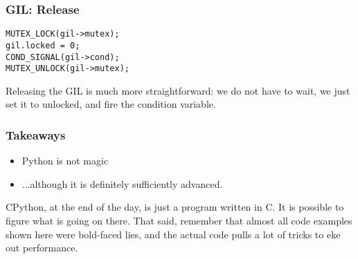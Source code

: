 \begin{frame}[fragile]
\frametitle{GIL: Release}
\begin{lstlisting}
MUTEX_LOCK(gil->mutex);
gil.locked = 0;
COND_SIGNAL(gil->cond);
MUTEX_UNLOCK(gil->mutex);
\end{lstlisting}
\end{frame}

Releasing the GIL is much more straightforward:
we do not have to wait,
we just set it to unlocked,
and fire the condition variable.

\begin{frame}
\frametitle{Takeaways}

\begin{itemize}
\item Python is not magic\pause
\item ...although it is definitely sufficiently advanced.
\end{itemize}
\end{frame}

CPython,
at the end of the day,
is just a program written in C.
It is possible to figure what is going on there.
That said,
remember that almost all code examples shown here were
bold-faced lies,
and the actual code pulls a lot of tricks to eke out performance.


